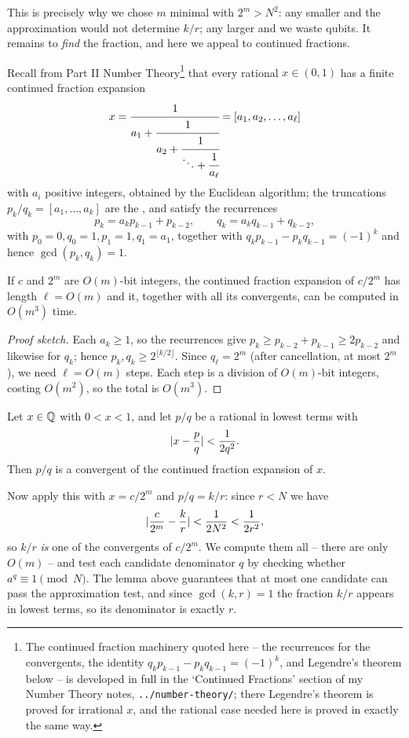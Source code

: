 \documentclass[a4paper]{scrartcl}
\begin{document}
This is precisely why we chose $m$ minimal with $2^m>N^2$: any smaller and the approximation would not determine $k/r$; any larger and we waste qubits. It remains to \emph{find} the fraction, and here we appeal to continued fractions.

Recall from Part II Number Theory\footnote{The continued fraction machinery quoted here -- the recurrences for the convergents, the identity $q_kp_{k-1}-p_kq_{k-1} = (-1)^k$, and Legendre's theorem below -- is developed in full in the `Continued Fractions' section of my Number Theory notes, \texttt{../number-theory/}; there Legendre's theorem is proved for irrational $x$, and the rational case needed here is proved in exactly the same way.} that every rational $x\in(0,1)$ has a finite continued fraction expansion
$$x = \cfrac{1}{a_1+\cfrac{1}{a_2+\cfrac1{\ddots+\cfrac1{a_\ell}}}} = [a_1,a_2,\dots,a_\ell]$$
with $a_i$ positive integers, obtained by the Euclidean algorithm; the truncations $p_k/q_k = [a_1,\dots,a_k]$ are the , and satisfy the recurrences
$$p_k = a_kp_{k-1}+p_{k-2}, \qquad q_k = a_kq_{k-1}+q_{k-2},$$
with $p_0 = 0, q_0 = 1, p_1 = 1, q_1 = a_1$, together with $q_kp_{k-1}-p_kq_{k-1} = (-1)^k$ and hence $\gcd(p_k,q_k)=1$.

\begin{theorem}
	If $c$ and $2^m$ are $O(m)$-bit integers, the continued fraction expansion of $c/2^m$ has length $\ell = O(m)$ and it, together with all its convergents, can be computed in $O(m^3)$ time.
\end{theorem}

\begin{proof}[Proof sketch]
	Each $a_k\geq1$, so the recurrences give $p_k\geq p_{k-2}+p_{k-1}\geq2p_{k-2}$ and likewise for $q_k$; hence $p_k,q_k\geq2^{\lfloor k/2\rfloor}$. Since $q_\ell = 2^m$ (after cancellation, at most $2^m$), we need $\ell = O(m)$ steps. Each step is a division of $O(m)$-bit integers, costing $O(m^2)$, so the total is $O(m^3)$.
\end{proof}

\begin{theorem}[Legendre]
	Let $x\in\mathbb{Q}$ with $0<x<1$, and let $p/q$ be a rational in lowest terms with
	$$\lvert x - \frac pq\rvert<\frac1{2q^2}.$$
	Then $p/q$ is a convergent of the continued fraction expansion of $x$.
\end{theorem}

Now apply this with $x = c/2^m$ and $p/q = k/r$: since $r<N$ we have
$$\lvert\frac c{2^m}-\frac kr\rvert<\frac1{2N^2}<\frac1{2r^2},$$
so $k/r$ \emph{is} one of the convergents of $c/2^m$. We compute them all -- there are only $O(m)$ -- and test each candidate denominator $q$ by checking whether $a^q\equiv1\pmod N$. The lemma above guarantees that at most one candidate can pass the approximation test, and since $\gcd(k,r)=1$ the fraction $k/r$ appears in lowest terms, so its denominator is exactly $r$.
\end{document}
